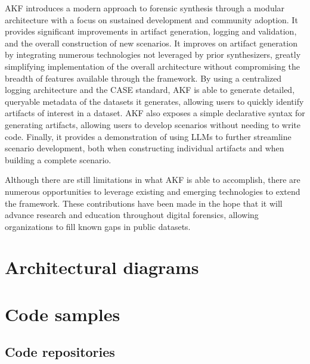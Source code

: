 \documentclass[letterpaper,12pt]{report}
\begin{document}
AKF introduces a modern approach to forensic synthesis through a modular
architecture with a focus on sustained development and community
adoption. It provides significant improvements in artifact generation,
logging and validation, and the overall construction of new scenarios.
It improves on artifact generation by integrating numerous technologies
not leveraged by prior synthesizers, greatly simplifying implementation
of the overall architecture without compromising the breadth of features
available through the framework. By using a centralized logging
architecture and the CASE standard, AKF is able to generate detailed,
queryable metadata of the datasets it generates, allowing users to
quickly identify artifacts of interest in a dataset. AKF also exposes a
simple declarative syntax for generating artifacts, allowing users to
develop scenarios without needing to write code. Finally, it provides a
demonstration of using LLMs to further streamline scenario development,
both when constructing individual artifacts and when building a complete
scenario.

Although there are still limitations in what AKF is able to accomplish,
there are numerous opportunities to leverage existing and emerging
technologies to extend the framework. These contributions have been made
in the hope that it will advance research and education throughout
digital forensics, allowing organizations to fill known gaps in public
datasets.



\printglossary[type=\acronymtype]
\printglossary

\nocite{*}


\appendix

\chapter{Architectural diagrams}\label{appendix-a}



\chapter{Code samples}\label{appendix-b}

\section{Code repositories}\label{code-repositories}
\end{document}
